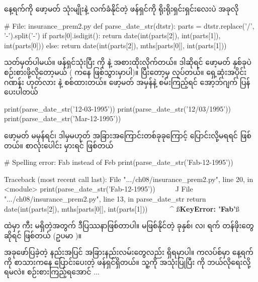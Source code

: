 နေ့ရက်ကို ဖော့မတ် သုံးမျိုးနဲ့ လက်ခံနိုင်တဲ့ ဖန်ရှင်ကို ရိုးရိုးရှင်းရှင်းလေးပဲ အခုလို
%
\begin{py}
# File: insurance_prem2.py
def parse_date_str(dtstr):
    parts = dtstr.replace('/', '-').split('-')
    if parts[0].isdigit():
        return date(int(parts[2]), int(parts[1]), int(parts[0]))
    else:
        return date(int(parts[2]), mths[parts[0]], int(parts[1]))
\end{py}
%
သတ်မှတ်ပါမယ်။  ဖန်ရှင်သုံးပြီး \fCode{/} ကို \fCode{-} နဲ့ အစားထိုးလိုက်တယ်။ ဒါဆိုရင် ဖော့မတ် နှစ်ခုပဲ စဉ်းစားဖို့လိုတော့မယ် ( ကနေ  ဖြစ်သွားမှာပါ)။ ပြီးတော့မှ  လုပ်တယ်။ ရှေ့ဆုံးအပိုင်း  ဂဏန်း ဟုတ်လား  နဲ့ စစ်ထားတယ်။ ဖော့မတ် အမှန်နဲ့ စမ်းကြည့်ရင်  အော့ဘ်ဂျက်  ပြန်ပေးပါတယ်
%
\begin{py}
print(parse_date_str('12-03-1995'))
print(parse_date_str('12/03/1995'))
print(parse_date_str('Mar-12-1995'))
\end{py}
%
ဖော့မတ် မမှန်ရင်၊ ဒါမှမဟုတ် အခြားအကြောင်းတစ်ခုခုကြောင့်  ပြောင်းလို့မရရင်  ဖြစ်တယ်။  စာလုံးပေါင်း မှားရင်  ဖြစ်တယ်
%
\begin{py}
# Spelling error: Fab instead of Feb
print(parse_date_str('Fab-12-1995'))
\end{py}
%
\begin{codetxt}
Traceback (most recent call last):
  File ".../ch08/insurance_prem2.py", line 20, in <module>
    print(parse_date_str('Fab-12-1995'))
          ^^^^^^^^^^^^^^^^^^^^^^^^^^^^^
  File ".../ch08/insurance_prem2.py", line 13, in parse_date_str
    return date(int(parts[2]), mths[parts[0]], int(parts[1]))
                               ~~~~^^^^^^^^^^
ß\textbf{KeyError: 'Fab'}ß
\end{codetxt}
 ထဲမှာ  ကီး မရှိတဲ့အတွက် ဒီပြဿနာဖြစ်တာပါ။ မဖြစ်နိုင်တဲ့ ခုနှစ်၊ လ၊ ရက် တန်ဖိုးတွေဆိုရင်  ဖြစ်တယ် (ဥပမာ )။

အခုဖော်ပြခဲ့တဲ့ နည်းအပြင် အခြားနည်းလမ်းတွေလည်း ရှိရမှာပါ။  ကလပ်စ်မှာ နေ့ရက်ကို စာသားကနေ  ပြောင်းပေးတဲ့  ဖန်ရှင်ရှိတယ်။ သူ့ကို အသုံးပြုပြီး  ကို ဘယ်လိုရေးလို့ ရမလဲ။ စဉ်းစားကြည့်ရအောင် $\ldots$

